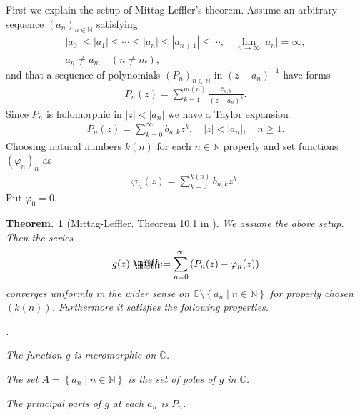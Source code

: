 \documentclass[openany, a4paper, oneside]{jsbook}
\makeatletter
\newcounter{enum2}
\renewenvironment{enumerate}{%
\begin{list}%
{%
\arabic{enum2}.\ \,%
}%
{%
\usecounter{enum2}
\setlength{\itemindent}{0pt}%
\setlength{\leftmargin}{15pt}%
\setlength{\rightmargin}{0pt}%
\setlength{\labelsep}{0pt}%
\setlength{\labelwidth}{6pt}%
\setlength{\itemsep}{0pt}%
\setlength{\parsep}{0pt}%
\setlength{\listparindent}{0pt}%
}
}{%
\end{list}%
}
\newcommand*{\defeq}{\mathrel{\rlap{%
\raisebox{0.3ex}{$\m@th\cdot$}}%
\raisebox{-0.3ex}{$\m@th\cdot$}}%
=}
\theoremstyle{break}
\theoremstyle{breakdefn}
\newtheorem{thm}{Theorem.}[section]
\newcommand{\abs}[1]{\left|#1\right|}
\newcommand{\rbk}[1]{\left (#1\right)}
\newcommand{\relmiddle}[1]{\mathrel{}\middle#1\mathrel{}}
\newcommand{\set}[2]{\left\{#1 \relmiddle| #2\right\}}
\newcommand{\bbC}{\mathbb{C}}
\newcommand{\bbN}{\mathbb{N}}
\makeatother
\begin{document}
First we explain the setup of Mittag-Leffler's theorem.
Assume an arbitrary sequence $(a_n)_{n \in \bbN}$ satisfying
\begin{gather}
 \abs{a_0} \leq \abs{a_1} \leq \cdots \leq \abs{a_n} \leq \abs{a_{n+1}} \leq \cdots, \quad \lim_{n \to \infty} \abs{a_n} = \infty, \\
 a_n \neq a_m \quad (n \neq m),
\end{gather}
and that a sequence of polynomials $(P_n)_{n \in \bbN}$ in $(z - a_n)^{-1}$ have forms
\begin{align}
 P_n (z)
 =
 \sum_{k=1}^{m (n)} \frac{c_{n,k}}{(z - a_n)^k}.
\end{align}
Since $P_n$ is holomorphic in $\abs{z} < \abs{a_n}$ we have a Taylor expansion
\begin{align}
 P_n (z)
 =
 \sum_{k=0}^{\infty} b_{n,k} z^k, \quad \abs{z} < \abs{a_n}, \quad n \geq 1.
\end{align}
Choosing natural numbers $k (n)$ for each $n \in \bbN$ properly and set functions $(\varphi_n)_n$ as
\begin{align}
 \varphi_n (z)
 =
 \sum_{k=0}^{k (n)} b_{n, k} z^k.
\end{align}
Put $\varphi_0 = 0$.
\begin{thm}[Mittag-Leffler. Theorem 10.1 in \cite{MitsuoSugiura2}]
 We assume the above setup.
 Then the series
 \begin{align}
  g (z)
  \defeq
  \sum_{n=0}^{\infty} \rbk{P_n (z) - \varphi_n (z)}
 \end{align}
 converges uniformly in the wider sense on $\bbC \setminus \set{a_n}{n \in \bbN}$ for properly chosen $(k (n))$.
 Furthermore it satisfies the following properties.
\begin{enumerate}
\item The function $g$ is meromorphic on $\bbC$.
\item The set $A = \set{a_n}{n \in \bbN}$ is the set of poles of $g$ in $\bbC$.
\item The principal parts of $g$ at each $a_n$ is $P_n$.
\end{enumerate}
\end{thm}
\end{document}
